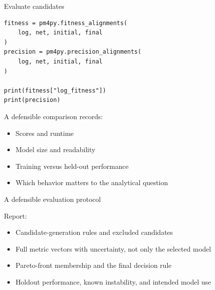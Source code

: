\documentclass[aspectratio=169,11pt]{beamer}
\begin{document}
\begin{frame}[fragile]{Evaluate candidates}
\begin{lstlisting}[style=python]
fitness = pm4py.fitness_alignments(
    log, net, initial, final
)
precision = pm4py.precision_alignments(
    log, net, initial, final
)

print(fitness["log_fitness"])
print(precision)
\end{lstlisting}
  \vspace{0.2cm}
  A defensible comparison records:
  \begin{itemize}
    \item Scores and runtime
    \item Model size and readability
    \item Training versus held-out performance
    \item Which behavior matters to the analytical question
  \end{itemize}
\end{frame}

\begin{frame}{A defensible evaluation protocol}
  \centering
  \vspace{0.55cm}
  Report:
  \begin{itemize}
    \item Candidate-generation rules and excluded candidates
    \item Full metric vectors with uncertainty, not only the selected model
    \item Pareto-front membership and the final decision rule
    \item Holdout performance, known instability, and intended model use
  \end{itemize}
\end{frame}
\end{document}
